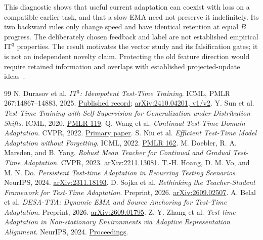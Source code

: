 \documentclass[11pt,a4paper]{article}
\begin{document}
This diagnostic shows that useful current adaptation can coexist with loss
on a compatible earlier task, and that a slow EMA need not preserve it
indefinitely. Its two backward rules only change speed and have identical
retention at equal $B$ progress. The deliberately chosen feedback and label
are not established empirical IT$^3$ properties. The result motivates the
vector study and its falsification gates; it is not an independent novelty
claim. Protecting the old feature direction would require retained
information and overlaps with established projected-update ideas~\cite{ogd}.

\begin{thebibliography}{99}\small
{} N. Durasov et al. \emph{IT$^3$: Idempotent Test-Time Training}.
ICML, PMLR 267:14867--14883, 2025.
\href{https://proceedings.mlr.press/v267/durasov25a.html}{Published record};
\href{https://arxiv.org/abs/2410.04201}{arXiv:2410.04201, v1/v2}.
 Y. Sun et al. \emph{Test-Time Training with Self-Supervision
for Generalization under Distribution Shifts}. ICML, 2020.
\href{https://proceedings.mlr.press/v119/sun20b.html}{PMLR 119}.
 Q. Wang et al. \emph{Continual Test-Time Domain Adaptation}.
CVPR, 2022.
\href{https://openaccess.thecvf.com/content/CVPR2022/html/Wang_Continual_Test-Time_Domain_Adaptation_CVPR_2022_paper.html}{Primary paper}.
 S. Niu et al. \emph{Efficient Test-Time Model Adaptation
without Forgetting}. ICML, 2022.
\href{https://proceedings.mlr.press/v162/niu22a.html}{PMLR 162}.
 M. Doebler, R. A. Marsden, and B. Yang. \emph{Robust Mean
Teacher for Continual and Gradual Test-Time Adaptation}. CVPR, 2023.
\href{https://arxiv.org/abs/2211.13081}{arXiv:2211.13081}.
 T.-H. Hoang, D. M. Vo, and M. N. Do. \emph{Persistent
Test-time Adaptation in Recurring Testing Scenarios}. NeurIPS, 2024.
\href{https://arxiv.org/abs/2311.18193}{arXiv:2311.18193}.
 D. Sojka et al. \emph{Rethinking the Teacher-Student
Framework for Test-Time Adaptation}. Preprint, 2026.
\href{https://arxiv.org/abs/2609.02507}{arXiv:2609.02507}.
 A. Belal et al. \emph{DESA-TTA: Dynamic EMA and Source
Anchoring for Test-Time Adaptation}. Preprint, 2026.
\href{https://arxiv.org/abs/2609.01795}{arXiv:2609.01795}.
 Z.-Y. Zhang et al. \emph{Test-time Adaptation in
Non-stationary Environments via Adaptive Representation Alignment}.
NeurIPS, 2024.
\href{https://papers.neurips.cc/paper_files/paper/2024/hash/abe31a12e83111fdf2cfd54deed5a2ce-Abstract-Conference.html}{Proceedings}.

\end{thebibliography}
\end{document}
